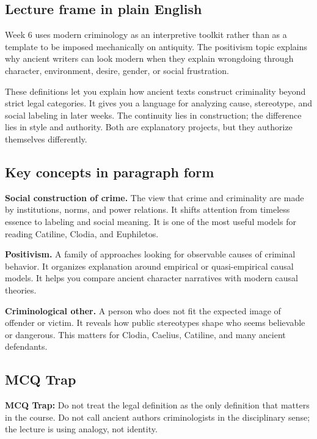 \documentclass[11pt]{article}
\begin{document}
\subsection{Lecture frame in plain English}

Week 6 uses modern criminology as an interpretive toolkit rather than as a template to be imposed mechanically on antiquity. The positivism topic explains why ancient writers can look modern when they explain wrongdoing through character, environment, desire, gender, or social frustration.

These definitions let you explain how ancient texts construct criminality beyond strict legal categories. It gives you a language for analyzing cause, stereotype, and social labeling in later weeks. The continuity lies in construction; the difference lies in style and authority. Both are explanatory projects, but they authorize themselves differently.

\subsection{Key concepts in paragraph form}

\textbf{Social construction of crime.} The view that crime and criminality are made by institutions, norms, and power relations. It shifts attention from timeless essence to labeling and social meaning. It is one of the most useful models for reading Catiline, Clodia, and Euphiletos.

\textbf{Positivism.} A family of approaches looking for observable causes of criminal behavior. It organizes explanation around empirical or quasi-empirical causal models. It helps you compare ancient character narratives with modern causal theories.

\textbf{Criminological other.} A person who does not fit the expected image of offender or victim. It reveals how public stereotypes shape who seems believable or dangerous. This matters for Clodia, Caelius, Catiline, and many ancient defendants.

\subsection{MCQ Trap}

\begin{quotebox}
\textbf{MCQ Trap:} Do not treat the legal definition as the only definition that matters in the course. Do not call ancient authors criminologists in the disciplinary sense; the lecture is using analogy, not identity.
\end{quotebox}
\end{document}
